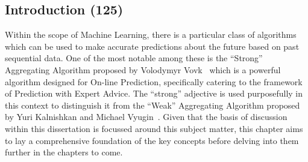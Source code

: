 



\subsection{Introduction (125)}
Within the scope of Machine Learning, there is a particular class of algorithms which can be used to make accurate predictions about the future based on past sequential data. One of the most notable among these is the ``Strong'' Aggregating Algorithm proposed by Volodymyr Vovk~\cite{vovk:1990} which is a powerful algorithm designed for On-line Prediction, specifically catering to the framework of Prediction with Expert Advice. The ``strong'' adjective is used purposefully in this context to distinguish it from the ``Weak'' Aggregating Algorithm proposed by Yuri Kalnishkan and Michael Vyugin~\cite{kalnishkan/vyugin:2008}. Given that the basis of discussion within this dissertation is focussed around this subject matter, this chapter aims to lay a comprehensive foundation of the key concepts before delving into them further in the chapters to come.


